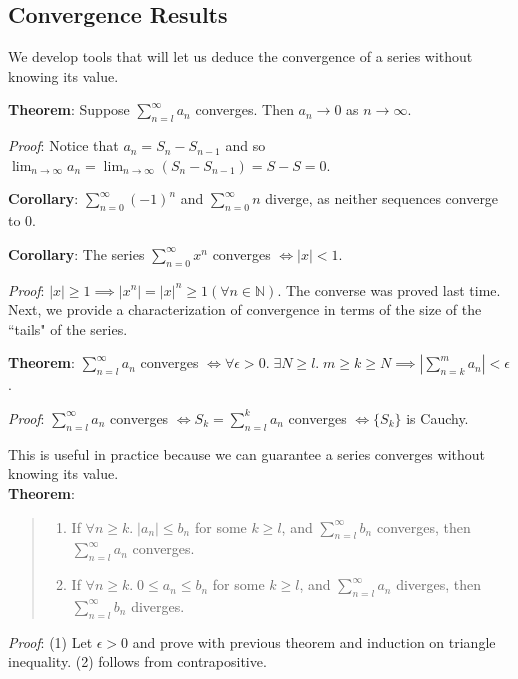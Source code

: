 \documentclass[11pt]{article}
\begin{document}
\subsection{Convergence Results}

We develop tools that will let us deduce the convergence of a series without knowing its value.

\textbf{Theorem}: Suppose $\sum_{n=l}^\infty a_n$ converges. Then $a_n \to 0$ as $n \to \infty$.

\emph{Proof}: Notice that $a_n = S_n - S_{n-1}$ and so $\lim_{n \to \infty} a_n = \lim_{n \to \infty} (S_n - S_{n-1}) = S - S = 0$.

\textbf{Corollary}: $\sum_{n=0}^\infty (-1)^n$ and $\sum_{n=0}^\infty n$ diverge, as neither sequences converge to 0.

\textbf{Corollary}: The series $\sum_{n=0}^\infty x^n$ converges $\iff |x| < 1$.

\emph{Proof}: $|x| \geq 1 \implies |x^n| = |x|^n \geq 1 (\forall n \in \mathbb{N})$. The converse was proved last time.\\

Next, we provide a characterization of convergence in terms of the size of the ``tails" of the series.

\textbf{Theorem}: $\sum_{n=l}^\infty a_n$ converges $\iff \forall \epsilon > 0.\; \exists N \geq l.\; m \geq k \geq N \implies |\sum_{n=k}^m a_n| < \epsilon$.

\emph{Proof}: $\sum_{n=l}^\infty a_n$ converges $\iff S_k = \sum_{n=l}^k a_n$ converges $\iff \{S_k\}$ is Cauchy.

This is useful in practice because we can guarantee a series converges without knowing its value.\\

\textbf{Theorem}:
\begin{quote}\vspace{-0.3cm}
	\begin{enumerate}
	\item If $\forall n \geq k.\; |a_n| \leq b_n$ for some $k \geq l$, and $\sum\limits_{n=l}^\infty b_n$ converges, then $\sum\limits_{n=l}^\infty a_n$ converges.
	\item If $\forall n \geq k.\; 0 \leq a_n \leq b_n$ for some $k \geq l$, and $\sum\limits_{n=l}^\infty a_n$ diverges, then $\sum\limits_{n=l}^\infty b_n$ diverges.
	\end{enumerate}
\end{quote}

\emph{Proof}: (1) Let $\epsilon > 0$ and prove with previous theorem and induction on triangle inequality. (2) follows from contrapositive.
\end{document}

